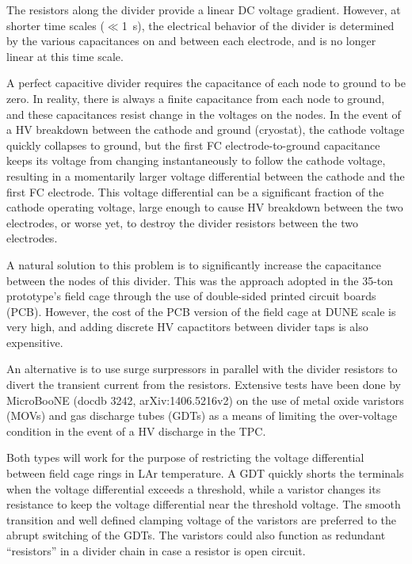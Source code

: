 The resistors along the divider provide a linear DC voltage gradient. However, at shorter time scales ($\ll$1~s), the electrical behavior of the divider is determined by the various capacitances on and between each electrode, and %
 is no longer linear at this time scale. 

A perfect capacitive divider requires the capacitance of each node to ground to be zero.  In reality, there is always a finite capacitance from each node to ground, and these capacitances resist change in the voltages on the nodes. In the event of a HV breakdown between the cathode %
and ground (cryostat), the cathode voltage quickly collapses to ground, but the first FC electrode-to-ground capacitance keeps its voltage from changing instantaneously to follow the cathode voltage, resulting in a momentarily larger voltage differential between the cathode and the first FC electrode. This voltage differential can be a significant fraction of the cathode operating voltage, large enough to cause HV breakdown between the two electrodes, or worse yet, to destroy the divider resistors between the two electrodes.

A natural solution to this problem is to significantly increase the capacitance between the nodes of this divider. This was the approach adopted in the 35-ton prototype's field cage through the use of double-sided printed circuit boards (PCB).  However, the cost of the PCB version of the field cage at DUNE scale is very high, and adding discrete HV capactitors between divider taps is also expensitive.

An alternative is to use surge surpressors in parallel with the divider resistors to divert the transient current from the resistors. Extensive tests have been done by MicroBooNE (docdb 3242, arXiv:1406.5216v2)  on the use of metal oxide varistors (MOVs) and gas discharge tubes (GDTs) as a means of limiting the over-voltage condition in the event of a HV discharge in the TPC. 

Both types will work for the purpose of restricting the voltage differential between field cage rings in LAr temperature. 
A GDT quickly shorts the terminals when the voltage differential exceeds a threshold, while
a varistor changes its resistance to keep the voltage differential near the threshold voltage.
The smooth transition and well defined clamping voltage of the varistors are preferred to the abrupt switching of the GDTs.
The varistors could also function as redundant ``resistors'' in a divider chain in case a resistor is open circuit. 

